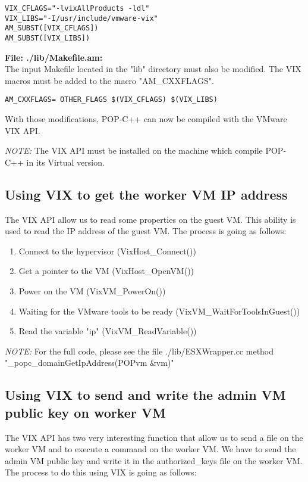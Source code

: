 \begin{lstlisting}
VIX_CFLAGS="-lvixAllProducts -ldl"
VIX_LIBS="-I/usr/include/vmware-vix"
AM_SUBST([VIX_CFLAGS])
AM_SUBST([VIX_LIBS])
\end{lstlisting}\s

\textbf{File: ./lib/Makefile.am:}\\
The input Makefile located in the "lib" directory must also be modified. The VIX macros must be added to the macro "AM\_CXXFLAGS". \s

\begin{lstlisting}
AM_CXXFLAGS= OTHER_FLAGS $(VIX_CFLAGS) $(VIX_LIBS)
\end{lstlisting}\s

With those modifications, POP-C++ can now be compiled with the VMware VIX API. \s

\textit{NOTE:} The VIX API must be installed on the machine which compile POP-C++ in its Virtual version. 


\subsection{Using VIX to get the worker VM IP address}
The VIX API allow us to read some properties on the guest VM. This ability is used to read the IP address of the guest VM. The process is going as follows:

\begin{enumerate}
\item Connect to the hypervisor (VixHost\_Connect())
\item Get a pointer to the VM (VixHost\_OpenVM())
\item Power on the VM (VixVM\_PowerOn())
\item Waiting for the VMware tools to be ready (VixVM\_WaitForToolsInGuest())
\item Read the variable "ip" (VixVM\_ReadVariable())
\end{enumerate}

\textit{NOTE:} For the full code, please see the file ./lib/ESXWrapper.cc method "\_popc\_domainGetIpAddress(POPvm \&vm)"

\subsection{Using VIX to send and write the admin VM public key on worker VM}
The VIX API has two very interesting function that allow us to send a file on the worker VM and to execute a command on the worker VM. We have to send the admin VM public key and write it in the authorized\_keys file on the worker VM. The process to do this using VIX is going as follows: \s

